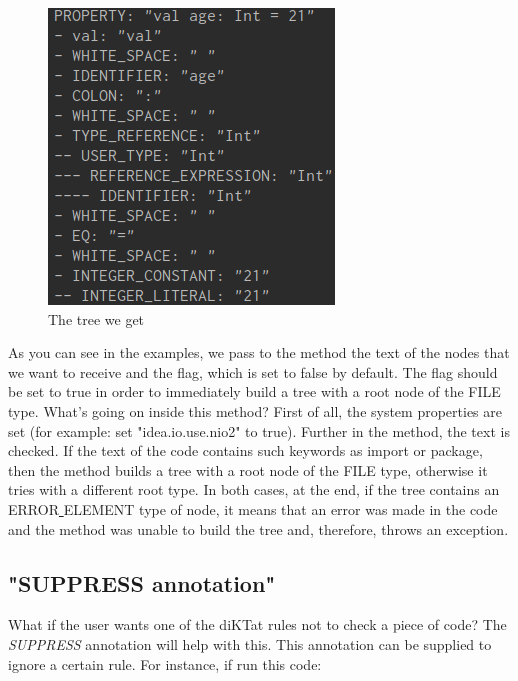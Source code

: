 \begin{figure}[H]
  \centering
  \includegraphics[scale=0.5]{wp/pictures/tree.png}
  \caption{The tree we get}   
\end{figure}

As you can see in the examples, we pass to the method the text of the nodes that we want to receive and the flag, which is set to false by default. The flag should be set to true in order to immediately build a tree with a root node of the FILE type. What's going on inside this method? First of all, the system properties are set (for example: set "idea.io.use.nio2" to true). Further in the method, the text is checked. If the text of the code contains such keywords as import or package, then the method builds a tree with a root node of the FILE type, otherwise it tries with a different root type. In both cases, at the end, if the tree contains an ERROR\underline{ }ELEMENT type of node, it means that an error was made in the code and the method was unable to build the tree and, therefore, throws an exception.\\

\subsection{"SUPPRESS annotation"}
\par
What if the user wants one of the diKTat rules not to check a piece of code? The \textsl{SUPPRESS} annotation will help with this. This annotation can be supplied to ignore a certain rule. For instance, if run this code:

